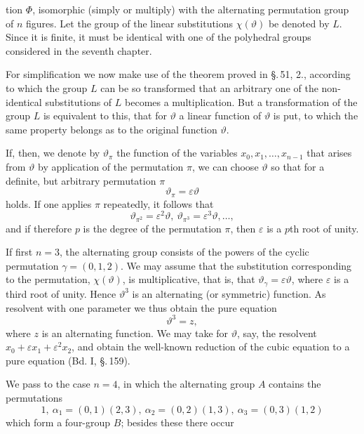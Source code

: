 tion $\Phi$, isomorphic (simply or multiply) with the alternating permutation
group of $n$ figures. Let the group of the linear substitutions
 $\chi(\vartheta)$ be denoted by $L$. Since it is
finite, it must be identical with one of the polyhedral groups
considered in the seventh chapter.

For simplification we now make use of the theorem proved
in \S.\,51, 2., according to which the group $L$ can be
so transformed that an arbitrary one of the non-identical
substitutions of $L$ becomes a multiplication. But a transformation
 of the group $L$ is equivalent to this, that for $\vartheta$
a linear function of $\vartheta$ is put, to which the same property
 belongs as to the original function $\vartheta$.

If, then, we denote by $\vartheta_\pi$ the function of the variables
$x_0, x_1, \ldots, x_{n-1}$ that arises from $\vartheta$ by application of the permutation $\pi$,
we can choose $\vartheta$ so that for a definite,
but arbitrary permutation $\pi$
\[
\vartheta_\pi = \varepsilon\vartheta
\]
holds. If one applies $\pi$ repeatedly, it follows that
\[
\vartheta_{\pi^2} = \varepsilon^2\vartheta,\ \vartheta_{\pi^3} = \varepsilon^3\vartheta, \ldots,
\]
and if therefore $p$ is the degree of the permutation $\pi$, then $\varepsilon$ is a
$p$th root of unity.

If first $n = 3$, the alternating group consists of
the powers of the cyclic permutation $\gamma = (0, 1, 2)$. We
may assume that the substitution corresponding to the permutation,
 $\chi(\vartheta)$, is multiplicative, that is, that $\vartheta_\gamma = \varepsilon\vartheta$, where $\varepsilon$
is a third root of unity. Hence $\vartheta^3$ is an alternating
(or symmetric) function. As resolvent with one parameter
 we thus obtain the pure equation
\[
\vartheta^3 = z,
\]
where $z$ is an alternating function. We may take for $\vartheta$,
say, the  resolvent $x_0 + \varepsilon x_1 + \varepsilon^2 x_2$, and
obtain the well-known reduction of the cubic equation to
a pure equation (Bd. I, \S.\,159).

We pass to the case $n = 4$, in which the alternating
 group $A$ contains the permutations
\[
1,\ \alpha_1 = (0, 1)(2, 3),\ \alpha_2 = (0, 2)(1, 3),\ \alpha_3 = (0, 3)(1, 2)
\]
which form a four-group $B$; besides these there occur
